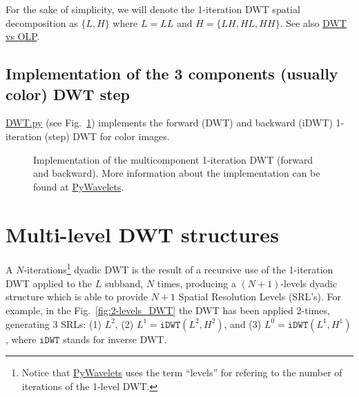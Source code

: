 For the sake of simplicity, we will denote the 1-iteration DWT spatial
decomposition as $\{L, H\}$ where $L=LL$ and $H=\{LH, HL, HH\}$. See
also
\href{https://nbviewer.jupyter.org/github/Sistemas-Multimedia/MRVC/blob/master/docs/DWT_vs_LPT.ipynb}{DWT
  vs OLP}.


\subsection{Implementation of the 3 components (usually color) DWT step}

\href{https://github.com/Sistemas-Multimedia/MRVC/blob/master/src/DWT.py}{DWT.py}
(see Fig.~\ref{fig:DWT}) implements the forward (DWT) and backward
(iDWT) 1-iteration (step) DWT for color images.

\begin{figure}
  
  \caption{Implementation of the multicomponent 1-iteration DWT
    (forward and backward). More information about the implementation
    can be found at
    \href{https://pywavelets.readthedocs.io/en/latest/index.html}{PyWavelets}.}
  \label{fig:DWT}
\end{figure}


\section{Multi-level DWT structures}

A $N$-iterations\footnote{Notice that
  \href{https://pywavelets.readthedocs.io/en/latest/index.html}{PyWavelets}
  uses the term ``levels'' for refering to the number of iterations of
  the 1-level DWT.} dyadic DWT is the result of a recursive use of the
1-iteration DWT applied to the $L$ subband, $N$ times, producing a
$(N+1)$-levels dyadic structure which is able to provide $N+1$ Spatial
Resolution Levels (SRL's). For example, in the
Fig.~\ref{fig:2-levels_DWT} the DWT has been applied 2-times,
generating 3 SRLs: (1) $L^2$, (2) $L^1=\mathtt{iDWT}(L^2, H^2)$, and
(3) $L^0=\mathtt{iDWT}(L^1, H^1)$, where $\mathtt{iDWT}$ stands for
inverse DWT.

